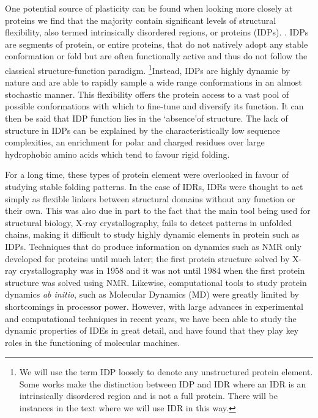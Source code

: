 One potential source of plasticity can be found when looking more closely at proteins we find that the majority contain significant levels of structural flexibility, also termed intrinsically disordered regions, or proteins (IDPs). .  IDPs are segments of protein, or entire proteins, that do not natively adopt any stable conformation or fold but are often functionally active and thus do not follow the classical structure-function paradigm. \footnote{We will use the term IDP loosely to denote any unstructured protein element. Some works make the distinction between IDP and IDR where an IDR is an intrinsically disordered region and is not a full protein. There will be instances in the text where we will use IDR in this way.}Instead, IDPs are highly dynamic by nature and are able to rapidly sample a wide range conformations in an almost stochastic manner. This flexibility offers the protein access to a vast pool of possible conformations with which to fine-tune and diversify its function. It can then be said that IDP function lies in the \lq absence\rq of structure. The lack of structure in IDPs can be explained by the characteristically low sequence complexities, an enrichment for polar and charged residues over large hydrophobic amino acids which tend to favour rigid folding. 

For a long time, these types of protein element were overlooked in favour of studying stable folding patterns. In the case of IDRs, IDRs were thought to act simply as flexible linkers between structural domains without any  function or their own. This was also due in part to the fact that the main tool being used for structural biology, X-ray crystallography, fails to detect patterns in unfolded chains, making it difficult to study highly dynamic elements in protein such as IDPs. Techniques that do produce information on dynamics such as NMR only developed for proteins until much later; the first protein structure solved by X-ray crystallography was in 1958 and it was not until 1984 when the first protein structure was solved using NMR. Likewise, computational tools to study protein dynamics {\it ab initio}, such as Molecular Dynamics (MD) were greatly limited by shortcomings in processor power. However, with large advances in experimental and computational techniques in recent years, we have been able to study the dynamic properties of IDEs in great detail, and have found that they play key roles in the functioning of molecular machines. 


